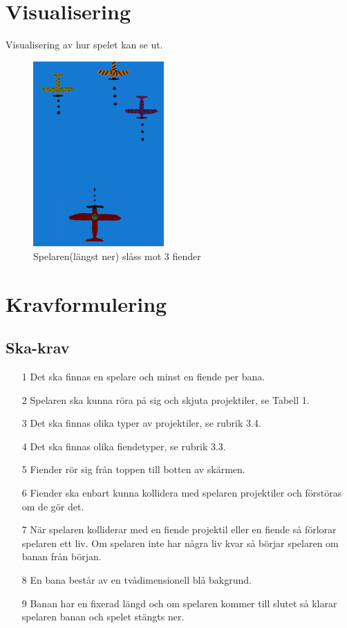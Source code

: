 \documentclass{TDP005mall}
\begin{document}
\section{Visualisering}
Visualisering av hur spelet kan se ut.
\begin{figure}[H]
  \centering
  \includegraphics[width=5cm]{Dogeater.png}
  \caption{Spelaren(längst ner) slåss mot 3 fiender}
\end{figure}

\section{Kravformulering}
\subsection{Ska-krav}
\begin{enumerate}
  \item [1] Det ska finnas en spelare och minst en fiende per bana.
  \item [2] Spelaren ska kunna röra på sig och skjuta projektiler, se Tabell 1.
  \item [3] Det ska finnas olika typer av projektiler, se rubrik 3.4.
  \item [4] Det ska finnas olika fiendetyper, se rubrik 3.3. 
  \item [5] Fiender rör sig från toppen till botten av skärmen.
  \item [6] Fiender ska enbart kunna kollidera med spelaren projektiler och förstöras om de gör det.
  \item [7] När spelaren kolliderar med en fiende projektil eller en fiende så förlorar spelaren ett liv.
            Om spelaren inte har några liv kvar så börjar spelaren om banan från början.
  \item [8] En bana består av en tvådimensionell blå bakgrund.
  \item [9] Banan har en fixerad längd och om spelaren kommer till slutet så klarar spelaren banan och spelet stängts ner.
\end{enumerate}
\end{document}
